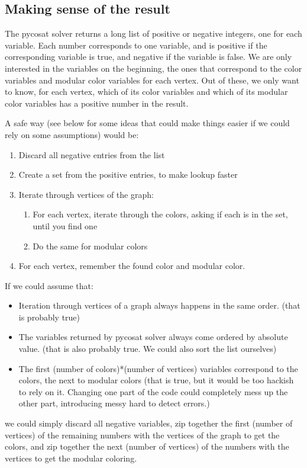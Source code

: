 \documentclass[letterpaper]{article}
\begin{document}
\subsection{Making sense of the result}

The pycosat solver returns a long list of positive or negative integers, one
for each variable.  Each number corresponds to one variable, and is positive if
the corresponding variable is true, and negative if the variable is false.  We
are only interested in the variables on the beginning, the ones that correspond
to the color variables and modular color variables for each vertex. Out of
these, we only want to know, for each vertex, which of its color variables and
which of its modular color variables has a positive number in the result. 

A safe way (see below for some ideas that could make things easier if we could
rely on some assumptions) would be:
\begin{enumerate}
   \item Discard all negative entries from the list
   \item Create a set from the positive entries, to make lookup faster
   \item Iterate through vertices of the graph:
      \begin{enumerate}
         \item For each vertex, iterate through the colors, asking if each is
            in the set, until you find one
         \item Do the same for modular colors
      \end{enumerate}
   \item For each vertex, remember the found color and modular color.
\end{enumerate}

If we could assume that:
\begin{itemize}
   \item Iteration through vertices of a graph always happens in the same
      order. (that is probably true)
   \item The variables returned by pycosat solver always come ordered by
      absolute value. (that is also probably true.  We could also sort the list
      ourselves)
   \item The first (number of colors)*(number of vertices) variables correspond
      to the colors, the next to modular colors (that is true, but it would be
      too hackish to rely on it.  Changing one part of the code could
      completely mess up the other part, introducing messy hard to detect
      errors.)
\end{itemize}
we could simply discard all negative variables, zip together the first (number
of vertices) of the remaining numbers with the vertices of the graph to get the
colors, and zip together the next (number of vertices) of the numbers with the
vertices to get the modular coloring. 
\end{document}
